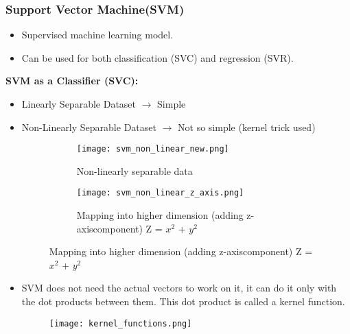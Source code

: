 \documentclass{beamer}
\begin{document}
\begin{frame}[t, allowframebreaks]

\frametitle{\quad \huge Support Vector Machine(SVM)}
\begin{itemize} 
\item Supervised machine learning model.
\item Can be used for both classification (SVC) and regression (SVR).
\end{itemize}
\textbf{SVM as a Classifier (SVC):}
\vfill{}
\begin{itemize} 
\fontsize{7}{8.4}\selectfont
\item Linearly Separable Dataset $\rightarrow$ Simple
\item Non-Linearly Separable Dataset $\rightarrow$ Not so simple (kernel trick used)

\begin{figure}
\begin{subfigure}[b]{.4\textwidth}
\centering
\texttt{[image: svm\_non\_linear\_new.png]}
\caption*{\centering \tiny Non-linearly separable data}
\end{subfigure}
\begin{subfigure}[b]{.5\textwidth}
\centering
\texttt{[image: svm\_non\_linear\_z\_axis.png]}
\caption*{\centering \tiny Mapping into higher dimension (adding z-axis\linebreak component) Z = \(x^2\) + \(y^2\)}
\end{subfigure}
\end{figure}
\item SVM does not need the actual vectors to work on it, it can do it only with the dot products between them.
This dot product is called a kernel function.
\begin{figure}
\raggedright
\texttt{[image: kernel\_functions.png]}

\end{figure}
\end{itemize}
\end{frame}
\end{document}
